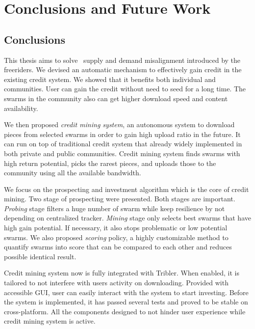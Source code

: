 \chapter{Conclusions and Future Work}
\label{chp:conclusionsandfuturework}

\section{Conclusions}
This thesis aims to solve \bt~supply and demand misalignment introduced by the freeriders. We devised an automatic mechanism to effectively gain credit in the existing credit system. We showed that it benefits both individual and communities. User can gain the credit without need to seed for a long time. The swarms in the community also can get higher download speed and content availability.

We then proposed \textit{credit mining system}, an autonomous system to download pieces from selected swarms in order to gain high upload ratio in the future. It can run on top of traditional credit system that already widely implemented in both private and public communities. Credit mining system finds swarms with high return potential, picks the rarest pieces, and uploads those to the community using all the available bandwidth.

We focus on the prospecting and investment algorithm which is the core of credit mining. Two stage of prospecting were presented. Both stages are important. \textit{Probing} stage filters a huge number of swarm while keep resilience by not depending on centralized tracker. \textit{Mining} stage only selects best swarms that have high gain potential. If necessary, it also stops problematic or low potential swarms. We also proposed \textit{scoring} policy, a highly customizable method to quantify swarms into score that can be compared to each other and reduces possible identical result.

Credit mining system now is fully integrated with Tribler. When enabled, it is tailored to not interfere with users activity on downloading. Provided with accessible GUI, user can easily interact with the system to start investing. Before the system is implemented, it has passed several tests and proved to be stable on cross-platform. All the components designed to not hinder user experience while credit mining system is active.

